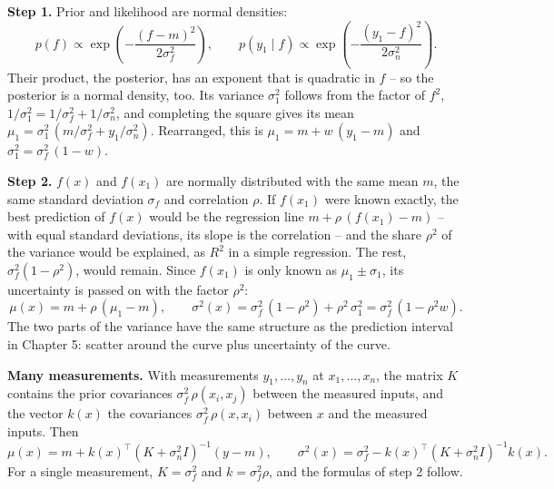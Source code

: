 \documentclass[
  letterpaper,
  DIV=11,
  numbers=noendperiod]{scrreprt}
\begin{document}
\begin{tcolorbox}[enhanced jigsaw, left=2mm, title=\textcolor{quarto-callout-note-color}{\faInfo}\hspace{0.5em}{Extension: where do the formulas come from?}, opacityback=0, breakable, rightrule=.15mm, arc=.35mm, toptitle=1mm, colbacktitle=quarto-callout-note-color!10!white, opacitybacktitle=0.6, coltitle=black, colframe=quarto-callout-note-color-frame, bottomrule=.15mm, leftrule=.75mm, bottomtitle=1mm, titlerule=0mm, toprule=.15mm, colback=white]

\textbf{Step 1.} Prior and likelihood are normal densities:
\[p(f) \propto \exp\left(-\frac{(f - m)^2}{2\sigma_f^2}\right), \qquad p(y_1 \mid f) \propto \exp\left(-\frac{(y_1 - f)^2}{2\sigma_n^2}\right).\]
Their product, the posterior, has an exponent that is quadratic in \(f\)
-- so the posterior is a normal density, too. Its variance
\(\sigma_1^2\) follows from the factor of \(f^2\),
\(1/\sigma_1^2 = 1/\sigma_f^2 + 1/\sigma_n^2\), and completing the
square gives its mean
\(\mu_1 = \sigma_1^2\,(m/\sigma_f^2 + y_1/\sigma_n^2)\). Rearranged,
this is \(\mu_1 = m + w\,(y_1 - m)\) and
\(\sigma_1^2 = \sigma_f^2\,(1 - w)\).

\textbf{Step 2.} \(f(x)\) and \(f(x_1)\) are normally distributed with
the same mean \(m\), the same standard deviation \(\sigma_f\) and
correlation \(\rho\). If \(f(x_1)\) were known exactly, the best
prediction of \(f(x)\) would be the regression line
\(m + \rho\,(f(x_1) - m)\) -- with equal standard deviations, its slope
is the correlation -- and the share \(\rho^2\) of the variance would be
explained, as \(R^2\) in a simple regression. The rest,
\(\sigma_f^2(1 - \rho^2)\), would remain. Since \(f(x_1)\) is only known
as \(\mu_1 \pm \sigma_1\), its uncertainty is passed on with the factor
\(\rho^2\):
\[\mu(x) = m + \rho\,(\mu_1 - m), \qquad \sigma^2(x) = \sigma_f^2\,(1 - \rho^2) + \rho^2\,\sigma_1^2 = \sigma_f^2\,(1 - \rho^2 w).\]
The two parts of the variance have the same structure as the prediction
interval in Chapter 5: scatter around the curve plus uncertainty of the
curve.

\textbf{Many measurements.} With measurements \(y_1, \dots, y_n\) at
\(x_1, \dots, x_n\), the matrix \(K\) contains the prior covariances
\(\sigma_f^2\,\rho(x_i, x_j)\) between the measured inputs, and the
vector \(k(x)\) the covariances \(\sigma_f^2\,\rho(x, x_i)\) between
\(x\) and the measured inputs. Then
\[\mu(x) = m + k(x)^\top (K + \sigma_n^2 I)^{-1}(y - m), \qquad \sigma^2(x) = \sigma_f^2 - k(x)^\top (K + \sigma_n^2 I)^{-1} k(x).\]
For a single measurement, \(K = \sigma_f^2\) and
\(k = \sigma_f^2 \rho\), and the formulas of step 2 follow.

\end{tcolorbox}
\end{document}

